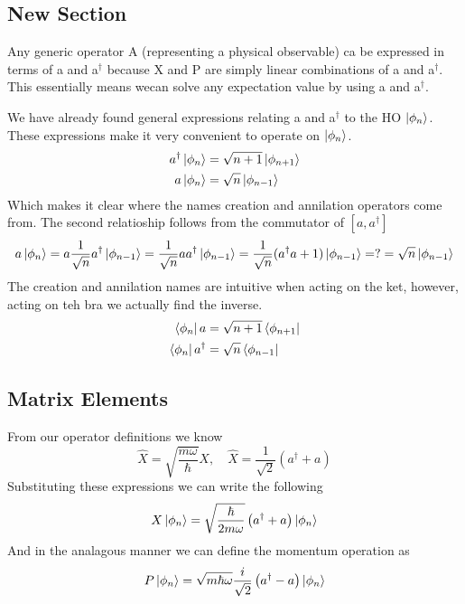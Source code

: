 \documentclass{article}
\newcommand{\be}{\begin{equation}}
\newcommand{\ee}{\end{equation}}
\newcommand{\dg}{\dagger}
\begin{document}
\subsection*{New Section}
Any generic operator A (representing a physical observable) ca be expressed in terms of a and a$^\dg$ because X and P are simply linear combinations of a and a$^\dg$.
This essentially means wecan solve any expectation value by using a and a$^\dg$. 

We have already found general expressions relating a and a$^\dg$ to the HO $\ket{\phi_n}$.
These expressions make it very convenient to operate on $\ket{\phi_n}$.
\be
\begin{split}
    a^\dg\ket{\phi_n} &= \sqrt{n+1}\ket{\phi_{n+1}}\\
    a\ket{\phi_n} &= \sqrt{n} \ket{\phi_{n-1}}
\end{split}
\ee
Which makes it clear where the names creation and annilation  operators come from. 
The second relatioship follows from the commutator of $[a,a^\dg]$
\be
a\ket{\phi_n} = a\frac{1}{\sqrt{n}}a^\dg \ket{\phi_{n-1}} = \frac{1}{\sqrt{n}}aa^\dg \ket{\phi_{n-1}} = \frac{1}{\sqrt{n}}(a^\dg a+1) \ket{\phi_{n-1}} = ? = \sqrt{n}\ket{\phi_{n-1}}
\ee
The creation and annilation names are intuitive when acting on the ket, however, acting on teh bra we actually find the inverse. 
\be
\begin{split}
    \bra{\phi_n}a &= \sqrt{n+1}\bra{\phi_{n+1}}\\
    \bra{\phi_n}a^\dg &= \sqrt{n}\bra{\phi_{n-1}}\\
\end{split}
\ee

\subsection*{Matrix Elements}
From our operator definitions we know
\be
\hat{X} = \sqrt{\frac{m\omega}{\hbar}}X, \quad \hat{X} = \frac{1}{\sqrt{2}}\left(a^\dg + a\right)
\ee
Substituting these expressions we can write the following
\be
X\ket{\phi_n} =  \sqrt{\frac{\hbar}{2m\omega}} \left(a^\dg + a\right)\ket{\phi_n}
\ee
And in the analagous manner we can define the momentum operation as 
\be
P\ket{\phi_n} = \sqrt{m\hbar\omega} \frac{i}{\sqrt{2}} \left(a^\dg - a \right) \ket{\phi_n}
\ee
\end{document}
